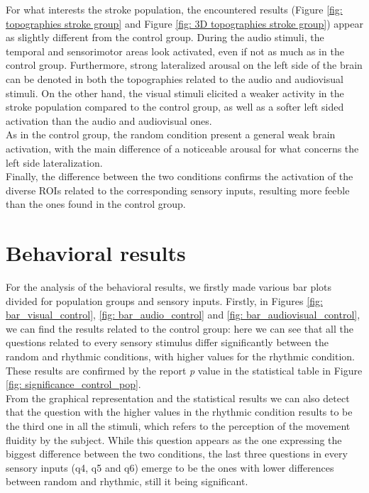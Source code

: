 For what interests the stroke population, the encountered results (Figure \ref{fig: topographies stroke group} and Figure \ref{fig: 3D topographies stroke group}) appear as slightly different from the control group. During the audio stimuli, the temporal and sensorimotor areas look activated, even if not as much as in the control group. Furthermore, strong lateralized arousal on the left side of the brain can be denoted in both the topographies related to the audio and audiovisual stimuli. On the other hand, the visual stimuli elicited a weaker activity in the stroke population compared to the control group, as well as a softer left sided activation than the audio and audiovisual ones. \\
As in the control group, the random condition present a general weak brain activation, with the main difference of a noticeable arousal for what concerns the left side lateralization. \\
Finally, the difference between the two conditions confirms the activation of the diverse ROIs related to the corresponding sensory inputs, resulting more feeble than the ones found in the control group. 

\section{Behavioral results}
For the analysis of the behavioral results, we firstly made various bar plots divided for population groups and sensory inputs. Firstly, in Figures \ref{fig: bar_visual_control}, \ref{fig: bar_audio_control} and \ref{fig: bar_audiovisual_control}, we can find the results related to the control group: here we can see that all the questions related to every sensory stimulus differ significantly between the random and rhythmic conditions, with higher values for the rhythmic condition. These results are confirmed by the report \textit{p} value in the statistical table in Figure \ref{fig: significance_control_pop}. \\
From the graphical representation and the statistical results we can also detect that the question with the higher values in the rhythmic condition results to be the third one in all the stimuli, which refers to the perception of the movement fluidity by the subject. While this question appears as the one expressing the biggest difference between the two conditions, the last three questions in every sensory inputs (q4, q5 and q6) emerge to be the ones with lower differences between random and rhythmic, still it being significant.

